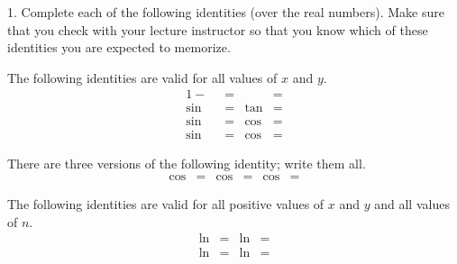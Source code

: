 \documentclass[12pt,]{book}
\theoremstyle{plain}
\theoremstyle{definition}
\numberwithin{equation}{section}
\providecommand\phantomsection{}
\newcommand{\fe}[2]{\mathop{{#1}{\left(#2\right)}}}
\begin{document}
\begin{exerciselist}
\item[1.]\phantomsection\hypertarget{exercise-identities-review}{\null}Complete each of the following identities (over the real numbers). Make sure that you check with your lecture instructor so that you know which of these identities you are expected to memorize.%
\par
The following identities are valid for all values of \(x\) and \(y\).\begin{align*}
1-\fe{\cos^2}{x}&=&\fe{\tan^2}{x}&=\\
\fe{\sin}{2x}&=&\fe{\tan}{2x}&=\\
\fe{\sin}{x+y}&=&\fe{\cos}{x+y}&=\\
\fe{\sin}{\frac{x}{2}}&=&\fe{\cos}{\frac{x}{2}}&=
\end{align*}%
\par
There are three versions of the following identity; write them all.\begin{align*}
\fe{\cos}{2x}&=&\fe{\cos}{2x}&=&\fe{\cos}{2x}&=
\end{align*}%
\par
The following identities are valid for all positive values of \(x\) and \(y\) and all values of \(n\).\begin{align*}
\fe{\ln}{xy}&=&\fe{\ln}{\frac{x}{y}}&=\\
\fe{\ln}{x^n}&=&\fe{\ln}{e^n}&=
\end{align*}%
\par\smallskip
\end{exerciselist}
\end{document}
